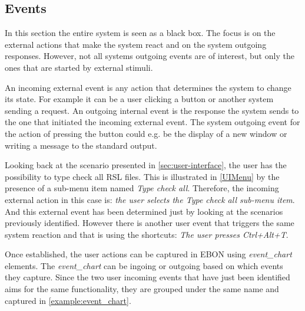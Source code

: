\documentclass[conference]{IEEEtran}
\begin{document}
%
\subsection{Events}
\label{sec:events}

In this section the entire system is seen as a black box. The focus is
on the external actions that make the system react and on the system
outgoing responses. However, not all systems outgoing events are of
interest, but only the ones that are started by external stimuli. 

An incoming external event is any action that determines the system to
change its state. For example it can be a user clicking a button or
another system sending a request. An outgoing internal event is the
response the system sends to the one that initiated the incoming
external event. The system outgoing event for the action of pressing
the button could e.g. be the display of a new window or writing a
message to the standard output.

Looking back at the scenario presented in
\autoref{sec:user-interface}, the user has the possibility to type
check all RSL files. This is illustrated in \autoref{UIMenu} by the
presence of a sub-menu item named \emph{Type check all}. Therefore,
the incoming external action in this case is: \emph{the user selects
the Type check all sub-menu item}. And this external event has been determined
just by looking at the scenarios previously identified. However there
is another user event that triggers the same system reaction and that
is using the shortcuts: \emph{The user presses Ctrl+Alt+T}.



Once established, the user actions can be captured in EBON using
\emph{event\_chart} elements. The \emph{event\_chart} can be ingoing
or outgoing based on which events they capture. Since the two user
incoming events that have just been identified aims for the same
functionality, they are grouped under the same name and captured in
\autoref{example:event_chart}.


\end{document}
